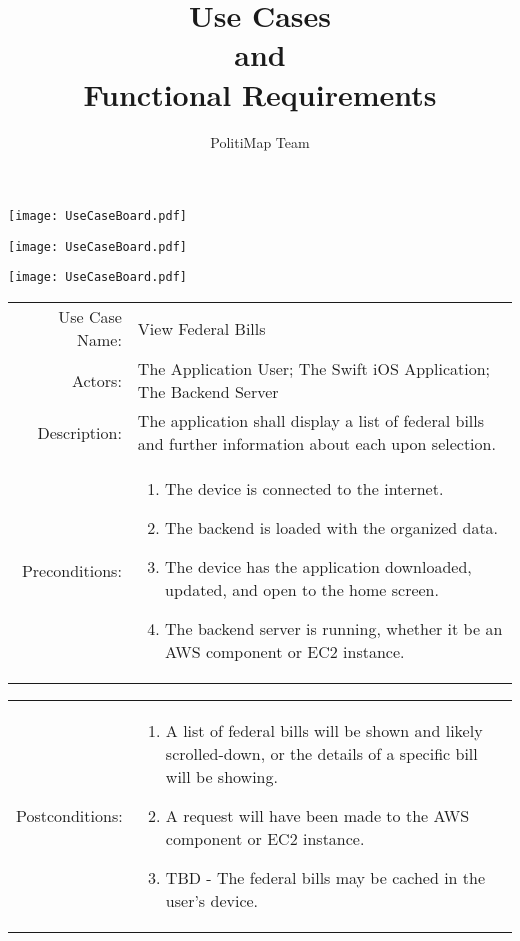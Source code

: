 \documentclass{beamer}
\title{Use Cases\\
  {\large and}\\
  Functional Requirements}
\author{PolitiMap Team}
\begin{document}
\begin{frame}
  \maketitle
\end{frame}

\begin{frame}
  \centering
  \texttt{[image: UseCaseBoard.pdf]}
\end{frame}
\begin{frame}
  \centering
  \texttt{[image: UseCaseBoard.pdf]}
\end{frame}
\begin{frame}
  \centering
  \texttt{[image: UseCaseBoard.pdf]}
\end{frame}
\begin{frame}
\begin{tabu}{rX}
Use Case Name:&View Federal Bills\\
Actors:&The Application User; The Swift iOS Application; The Backend Server\\
Description:&The application shall display a list of federal bills and further information about each upon selection.\\
Preconditions:&
\begin{enumerate}
\item The device is connected to the internet.
\item The backend is loaded with the organized data.
\item The device has the application downloaded, updated, and open to the home screen.
\item The backend server is running, whether it be an AWS component or EC2 instance.
\end{enumerate}\\
\end{tabu}
\end{frame}
  \begin{frame}
    \begin{tabu}{lX}
Postconditions:&
\begin{enumerate}
\item A list of federal bills will be shown and likely scrolled-down, or the details of a specific bill will be showing.
\item A request will have been made to the AWS component or EC2 instance.
\item TBD - The federal bills may be cached in the user's device.
\end{enumerate}
\end{tabu}
\end{frame}
\end{document}
